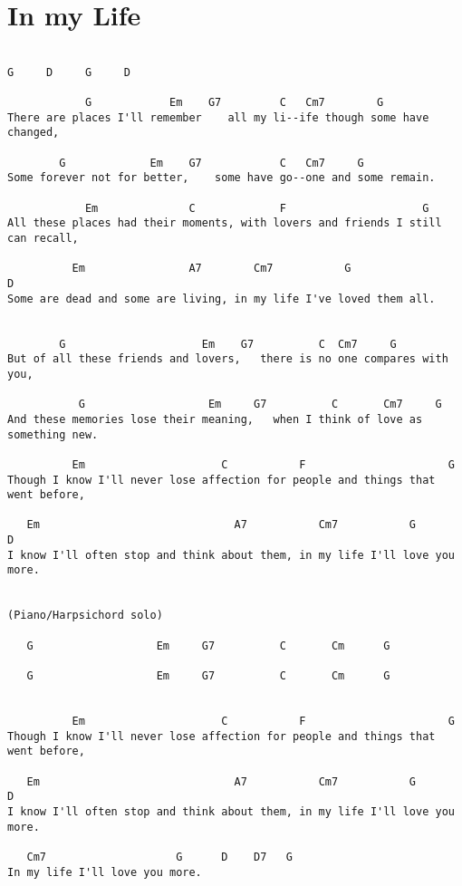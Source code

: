 \documentclass[leqno]{memoir}
\begin{document}
\chapter{In my Life}
\begin{verbatim}

G     D     G     D

            G            Em    G7         C   Cm7        G
There are places I'll remember    all my li--ife though some have changed,

        G             Em    G7            C   Cm7     G
Some forever not for better,    some have go--one and some remain.

            Em              C             F                     G
All these places had their moments, with lovers and friends I still can recall,

          Em                A7        Cm7           G                  D
Some are dead and some are living, in my life I've loved them all.


        G                     Em    G7          C  Cm7     G
But of all these friends and lovers,   there is no one compares with you,

           G                   Em     G7          C       Cm7     G
And these memories lose their meaning,   when I think of love as something new.

          Em                     C           F                      G
Though I know I'll never lose affection for people and things that went before,

   Em                              A7           Cm7           G               D
I know I'll often stop and think about them, in my life I'll love you more.


(Piano/Harpsichord solo)

   G                   Em     G7          C       Cm      G

   G                   Em     G7          C       Cm      G


          Em                     C           F                      G
Though I know I'll never lose affection for people and things that went before,

   Em                              A7           Cm7           G               D
I know I'll often stop and think about them, in my life I'll love you more.

   Cm7                    G      D    D7   G
In my life I'll love you more.
\end{verbatim}
\newpage
\end{document}
